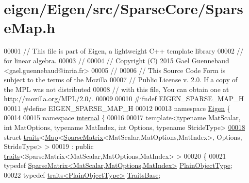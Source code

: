 \hypertarget{eigen_2_eigen_2src_2_sparse_core_2_sparse_map_8h_source}{}\section{eigen/\+Eigen/src/\+Sparse\+Core/\+Sparse\+Map.h}
\label{eigen_2_eigen_2src_2_sparse_core_2_sparse_map_8h_source}

\begin{DoxyCode}
00001 \textcolor{comment}{// This file is part of Eigen, a lightweight C++ template library}
00002 \textcolor{comment}{// for linear algebra.}
00003 \textcolor{comment}{//}
00004 \textcolor{comment}{// Copyright (C) 2015 Gael Guennebaud <gael.guennebaud@inria.fr>}
00005 \textcolor{comment}{//}
00006 \textcolor{comment}{// This Source Code Form is subject to the terms of the Mozilla}
00007 \textcolor{comment}{// Public License v. 2.0. If a copy of the MPL was not distributed}
00008 \textcolor{comment}{// with this file, You can obtain one at http://mozilla.org/MPL/2.0/.}
00009 
00010 \textcolor{preprocessor}{#ifndef EIGEN\_SPARSE\_MAP\_H}
00011 \textcolor{preprocessor}{#define EIGEN\_SPARSE\_MAP\_H}
00012 
00013 \textcolor{keyword}{namespace }\hyperlink{namespace_eigen}{Eigen} \{
00014 
00015 \textcolor{keyword}{namespace }\hyperlink{namespaceinternal}{internal} \{
00016 
00017 \textcolor{keyword}{template}<\textcolor{keyword}{typename} MatScalar, \textcolor{keywordtype}{int} MatOptions, \textcolor{keyword}{typename} MatIndex, \textcolor{keywordtype}{int} Options, \textcolor{keyword}{typename} Str\textcolor{keywordtype}{id}eType>
\hyperlink{struct_eigen_1_1internal_1_1traits_3_01_map_3_01_sparse_matrix_3_01_mat_scalar_00_01_mat_optionsc906e4e1b3a968ac003455586a92664c}{00018} \textcolor{keyword}{struct }\hyperlink{struct_eigen_1_1internal_1_1traits}{traits}<\hyperlink{group___core___module_class_eigen_1_1_map}{Map}<\hyperlink{group___sparse_core___module_class_eigen_1_1_sparse_matrix}{SparseMatrix}<MatScalar,MatOptions,MatIndex>, Options, StrideType> >
00019   : \textcolor{keyword}{public} \hyperlink{struct_eigen_1_1internal_1_1traits}{traits}<SparseMatrix<MatScalar,MatOptions,MatIndex> >
00020 \{
00021   \textcolor{keyword}{typedef} \hyperlink{group___sparse_core___module_class_eigen_1_1_sparse_matrix}{SparseMatrix<MatScalar,MatOptions,MatIndex>} 
      \hyperlink{group___sparse_core___module_class_eigen_1_1_sparse_matrix}{PlainObjectType};
00022   \textcolor{keyword}{typedef} \hyperlink{struct_eigen_1_1internal_1_1traits}{traits<PlainObjectType>} \hyperlink{struct_eigen_1_1internal_1_1traits}{TraitsBase};

\end{DoxyCode}
